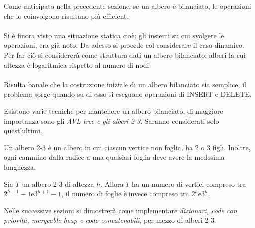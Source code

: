 \documentclass{subfiles}
\begin{document}
Come anticipato nella precedente sezione, se un albero è bilanciato, le operazioni che lo coinvolgono risultano più efficienti.
\\ \\
Si è finora visto una situazione statica cioè: gli insiemi su cui svolgere le operazioni, era già noto.
Da adesso si procede col considerare il caso dinamico.
\\
Per far ciò si considererà come struttura dati un albero bilanciato: alberi la cui altezza è logaritmica rispetto al numero di nodi.
\\ \\
Risulta banale che la costruzione iniziale di un albero bilanciato sia semplice, il problema sorge quando su di esso si eseguono operazioni di INSERT e DELETE.

\begin{Note*}
    Esistono varie tecniche per mantenere un albero bilanciato, di maggiore importanza sono gli \emph{AVL tree \emph{e gli } alberi 2-3}. Saranno considerati solo quest'ultimi.
\end{Note*}

\begin{Definition*}
    Un albero 2-3 è un albero in cui ciascun vertice non foglia, ha 2 o 3 figli. Inoltre, ogni cammino dalla radice a una qualsiasi foglia deve avere la medesima lunghezza.
\end{Definition*}

\begin{Lemma}
    Sia \(T\) un albero 2-3 di altezza \(h\). Allora \(T\) ha un numero di vertici compreso tra \(2^{h + 1} - 1 \text{e} 3^{h + 1} - 1\),
    il numero di foglie è invece compreso tra \(2^{h} \text{e} 3^{h}\).
\end{Lemma}

\noindent Nelle successive sezioni si dimostrerà come implementare \emph{dizionari, code con priorità, mergeable heap \emph{e} code concatenabili}, per mezzo di alberi 2-3.
\end{document}
